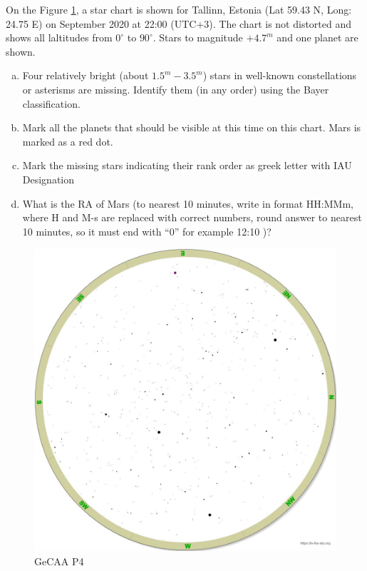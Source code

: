 \documentclass[a4paper,12pt]{extarticle}
\begin{document}
On the Figure \ref{GeCAA_2}, a star chart is shown for Tallinn, Estonia (Lat 59.43 N, Long: 24.75 E) on  September 2020 at 22:00 (UTC+3). The chart is not distorted and shows all laltitudes from $0^\circ$ to $90^\circ$. Stars to magnitude $+4.7^m$ and one planet are shown.
\begin{enumerate}[a.]
    \item Four relatively bright (about $1.5^m- 3.5^m$) stars in well-known constellations or asterisms are missing. Identify them (in any order) using the Bayer classification.
    \item Mark all the planets that should be visible at this time on this chart. Mars is marked as a red dot. 
    \item Mark the missing stars indicating their rank order as greek letter with IAU Designation
    \item What is the RA of Mars (to nearest 10 minutes, write in format HH:MMm, where H and M-s are replaced with correct numbers, round answer to nearest 10 minutes, so it must end with “0” for example 12:10 )?
\end{enumerate}
\begin{figure}
    \centering
    \includegraphics[width=0.95\linewidth]{GeCAA_2.png}
    \caption{GeCAA P4}
    \label{GeCAA_2}
\end{figure}

\clearpage
\end{document}
